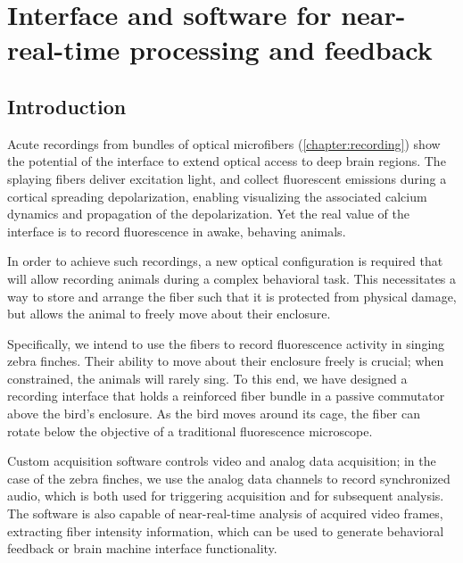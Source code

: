 \chapter{Interface and software for near-real-time processing and feedback}
\label{chapter:processing}

\thispagestyle{myheadings}

\graphicspath{{6_Processing/Figures/}}


\section{Introduction}

Acute recordings from bundles of optical microfibers 
(\cref{chapter:recording}) show the potential of the 
interface to extend optical access to deep brain 
regions. The splaying fibers deliver excitation light,
and collect fluorescent emissions during a cortical 
spreading depolarization, enabling visualizing the 
associated calcium dynamics and propagation of the 
depolarization. Yet the real value of the interface is 
to record fluorescence in awake, behaving animals.

In order to achieve such recordings, a new optical 
configuration is required that will allow recording 
animals during a complex behavioral task. This necessitates 
a way to store and arrange the fiber such that it is 
protected from physical damage, but allows the animal 
to freely move about their enclosure.

Specifically, we intend to use the fibers to record 
fluorescence activity in singing zebra finches. 
Their ability to move about their enclosure freely 
is crucial; when constrained, the animals will rarely 
sing. To this end, we have designed a recording interface 
that holds a reinforced fiber bundle in a passive 
commutator above the bird's enclosure. As the bird moves 
around its cage, the fiber can rotate below the objective 
of a traditional fluorescence microscope. 

Custom acquisition software controls video and analog 
data acquisition; in the case of the zebra finches, we 
use the analog data channels to record synchronized audio, 
which is both used for triggering acquisition and for subsequent 
analysis. The software is also capable of near-real-time 
analysis of acquired video frames, extracting fiber 
intensity information, which can be used to generate 
behavioral feedback or brain machine interface 
functionality.

